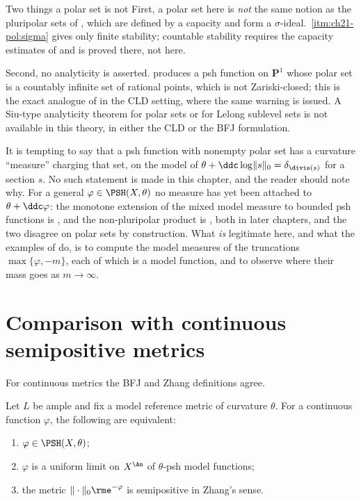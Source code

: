 \begin{warning}{Two things a polar set is not}
First, a polar set here is \emph{not} the same notion as the pluripolar sets
of , which are defined by a capacity and form a
\(\sigma\)-ideal.  \,\cref{itm:ch21-pol:sigma}
gives only finite stability; countable stability requires the capacity
estimates of  and is proved there, not here.

Second, no analyticity is asserted.  
produces a psh function on \(\mathbf P^1\) whose polar set is a countably
infinite set of rational points, which is not Zariski-closed; this is the
exact analogue of  in the CLD setting, where
the same warning is issued.  A Siu-type analyticity theorem for polar sets
or for Lelong sublevel sets is not available in this theory, in either the
CLD or the BFJ formulation.
\end{warning}

\begin{remark}
\label{rem:ch21-polar-ma}
It is tempting to say that a psh function with nonempty polar set has a
curvature ``measure'' charging that set, on the model of
\(\theta+\ddc\log\lVert s\rVert_0=\delta_{\divis(s)}\) for a section \(s\).
No such statement is made in this chapter, and the reader should note why.
For a general \(\varphi\in\PSH(X,\theta)\) no measure has yet been attached
to \(\theta+\ddc\varphi\): the monotone extension of the mixed model measure
to bounded psh functions is , and the
non-pluripolar product is , both in later
chapters, and the two disagree on polar sets by construction.  What
\emph{is} legitimate here, and what the examples of
 do, is to compute the model measures of the
truncations \(\max\{\varphi,-m\}\), each of which is a model function, and
to observe where their mass goes as \(m\to\infty\).
\end{remark}

\section{Comparison with continuous semipositive metrics}
\label{sec:ch21-continuous}

For continuous metrics the BFJ and Zhang definitions agree.

\begin{theorem}\label{thm:ch21-continuous-zhang}
Let \(L\) be ample and fix a model reference metric of curvature \(\theta\).
For a continuous function \(\varphi\), the following are equivalent:

\begin{enumerate}
\item \(\varphi\in\PSH(X,\theta)\);
\item \(\varphi\) is a uniform limit on \(X^{\An}\) of \(\theta\)-psh model
functions;
\item the metric \(\|\cdot\|_0\rme^{-\varphi}\) is semipositive in Zhang's
sense.
\end{enumerate}
\end{theorem}

